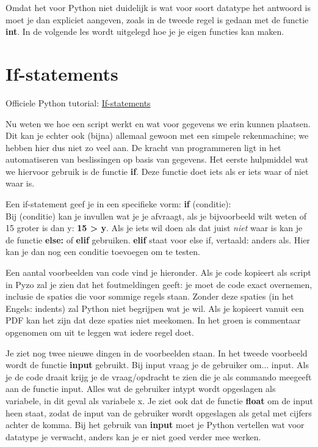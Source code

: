 Omdat het voor Python niet duidelijk is wat voor soort datatype het antwoord is moet je dan expliciet aangeven, zoals in de tweede regel is gedaan met de functie \textbf{int}. In de volgende les wordt uitgelegd hoe je je eigen functies kan maken.

\section{If-statements}
Officiele Python tutorial: \href{https://docs.python.org/3/tutorial/controlflow.html\#if-statements}{If-statements}

Nu weten we hoe een script werkt en wat voor gegevens we erin kunnen plaatsen. Dit kan je echter ook (bijna) allemaal gewoon met een simpele rekenmachine; we hebben hier dus niet zo veel aan. De kracht van programmeren ligt in het automatiseren van beslissingen op basis van gegevens. Het eerste hulpmiddel wat we hiervoor gebruik is de functie \textbf{if}. Deze functie doet iets als er iets waar of niet waar is. 

Een if-statement geef je in een specifieke vorm: \textbf{if} (conditie): \\
Bij (conditie) kan je invullen wat je je afvraagt, als je bijvoorbeeld wilt weten of 15 groter is dan y: \textbf{15 > y}. Als je iets wil doen als dat juist \textit{niet} waar is kan je de functie \textbf{else:} of \textbf{elif} gebruiken. \textbf{elif} staat voor else if, vertaald: anders als. Hier kan je dan nog een conditie toevoegen om te testen.

Een aantal voorbeelden van code vind je hieronder. Als je code kopieert als script in Pyzo zal je zien dat het foutmeldingen geeft: je moet de code exact overnemen, inclusie de spaties die voor sommige regels staan. Zonder deze spaties (in het Engels: indents) zal Python niet begrijpen wat je wil. Als je kopieert vanuit een PDF kan het zijn dat deze spaties niet meekomen. In het groen is commentaar opgenomen om uit te leggen wat iedere regel doet. 





Je ziet nog twee nieuwe dingen in de voorbeelden staan. In het tweede voorbeeld wordt de functie \textbf{input} gebruikt. Bij input vraag je de gebruiker om... input. Als je de code draait krijg je de vraag/opdracht te zien die je als commando meegeeft aan de functie input. Alles wat de gebruiker intypt wordt opgeslagen als variabele, in dit geval als variabele x. Je ziet ook dat de functie \textbf{float} om de input heen staat, zodat de input van de gebruiker wordt opgeslagen als getal met cijfers achter de komma. Bij het gebruik van \textbf{input} moet je Python vertellen wat voor datatype je verwacht, anders kan je er niet goed verder mee werken. 

